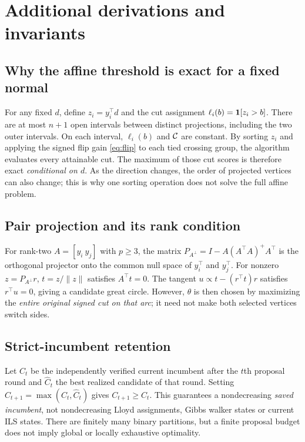 \section{Additional derivations and invariants}\label{app:proofs}
\subsection{Why the affine threshold is exact for a fixed normal}
For any fixed $d$, define $z_i=y_i^\top d$ and the cut assignment $\ell_i(b)=\mathbf{1}[z_i>b]$. There are at most $n+1$ open intervals between distinct projections, including the two outer intervals. On each interval, $\ell_i(b)$ and $\mathcal{C}$ are constant. By sorting $z_i$ and applying the signed flip gain \eqref{eq:flip} to each tied crossing group, the algorithm evaluates every attainable cut. The maximum of those cut scores is therefore exact \emph{conditional on $d$}. As the direction changes, the order of projected vertices can also change; this is why one sorting operation does not solve the full affine problem.

\subsection{Pair projection and its rank condition}
For rank-two $A=[y_i\ y_j]$ with $p\ge3$, the matrix $P_{A^\perp}=I-A(A^\top A)^+A^\top$ is the orthogonal projector onto the common null space of $y_i^\top$ and $y_j^\top$. For nonzero $z=P_{A^\perp}r$, $t=z/\|z\|$ satisfies $A^\top t=0$. The tangent $u\propto t-(r^\top t)r$ satisfies $r^\top u=0$, giving a candidate great circle. However, $\theta$ is then chosen by maximizing the \emph{entire original signed cut on that arc}; it need not make both selected vertices switch sides.

\subsection{Strict-incumbent retention}
Let $C_t$ be the independently verified current incumbent after the $t$th proposal round and $\widehat C_t$ the best realized candidate of that round. Setting $C_{t+1}=\max(C_t,\widehat C_t)$ gives $C_{t+1}\ge C_t$. This guarantees a nondecreasing \emph{saved incumbent}, not nondecreasing Lloyd assignments, Gibbs walker states or current ILS states. There are finitely many binary partitions, but a finite proposal budget does not imply global or locally exhaustive optimality.

